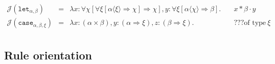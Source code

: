 \documentclass[runningheads,a4paper]{llncs}
\newcommand{\Termmap}{\mathcal{J}}
\newcommand{\quant}[2]{\forall #1[#2]}
\newcommand{\arrtype}{\Rightarrow}
\begin{document}
\[
\begin{array}{rcll}
\Termmap(\mathtt{let}_{\alpha,\beta}) & = & \lambda x : \quant{\chi}{
  \quant{\xi}{\alpha\langle\xi\rangle \arrtype \chi} \arrtype \chi},
  y : \quant{\xi}{\alpha\langle\chi\rangle \arrtype \beta}. \quad &
  x * \beta \cdot y \\
\Termmap(\mathtt{case}_{\alpha,\beta,\xi}) & = & \lambda x : (\alpha
  \times \beta), y : (\alpha \arrtype \xi), z : (\beta \arrtype \xi).
  \quad & ??? \text{of type}\ \xi \\
\end{array}
\]

\subsection{Rule orientation}
\end{document}
